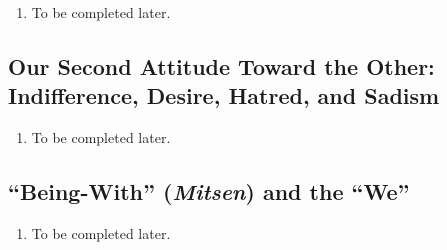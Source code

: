 \begin{enumerate}
  \item To be completed later.
\end{enumerate}

\subsection{Our Second Attitude Toward the Other: Indifference, Desire, Hatred, and Sadism}

\begin{enumerate}
  \item To be completed later.
\end{enumerate}

\subsection{\enquote{Being-With} (\emph{Mitsen}) and the \enquote{We}}

\begin{enumerate}
  \item To be completed later.
\end{enumerate}
